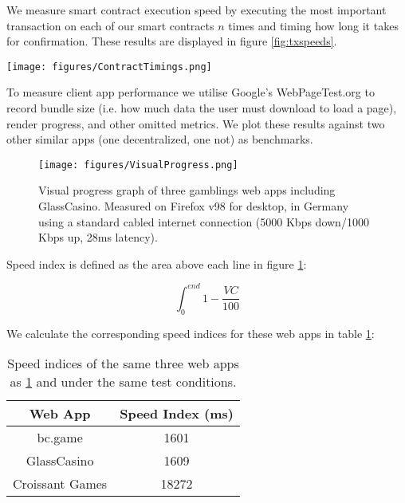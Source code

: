 \documentclass[10pt,journal,compsoc]{IEEEtran}
\begin{document}
We measure smart contract execution speed by executing the most important transaction on each of our smart contracts $n$ times and timing how long it takes for confirmation. These results are displayed in figure \ref{fig:txspeeds}.

\begin{figure*}[h]
    \centering
    \texttt{[image: figures/ContractTimings.png]}
    \caption{Distribution of timings of entry-point transactions for each of our smart contracts. These were measured on the Polygon Mumbai test network with automatic gas fee estimation from ethers.js.}
    \label{fig:txspeeds}
\end{figure*}

To measure client app performance we utilise Google's WebPageTest.org \cite{webpagetest} to record bundle size (i.e. how much data the user must download to load a page), render progress, and other omitted metrics. We plot these results against two other similar apps (one decentralized, one not) as benchmarks.

\begin{figure}[!h]
    \centering
    \texttt{[image: figures/VisualProgress.png]}
    \caption{Visual progress graph of three gamblings web apps including GlassCasino. Measured on Firefox v98 for desktop, in Germany using a standard cabled internet connection (5000 Kbps down/1000 Kbps up, 28ms latency).}
    \label{fig:visprog}
\end{figure}

Speed index is defined as the area above each line in figure \ref{fig:visprog}:

\begin{equation}
    \int_{0}^{end} 1 - \frac{VC}{100}
\end{equation}

We calculate the corresponding speed indices for these web apps in table \ref{tab:speedindices}:

\begin{table}[!h]
    \centering
    \caption{Speed indices of the same three web apps as \ref{fig:visprog} and under the same test conditions.}
    \label{tab:speedindices}
    \begin{tabular}{c | c}
        \hline\hline
        Web App & Speed Index (ms) \\ 
        \hline
        bc.game & 1601 \\
        GlassCasino & 1609 \\
        Croissant Games & 18272 \\
        \hline\hline
    \end{tabular}
\end{table}
\end{document}

